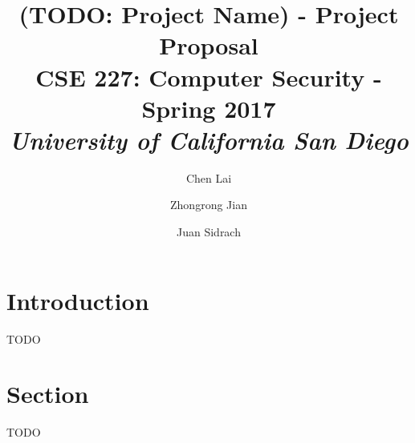 \documentclass[letterpaper,twocolumn,10pt]{article}
\begin{document}
\date{}

\title{\Large \textbf{
(TODO: Project Name) - Project Proposal } \\ \vspace{0.025 in} \large \normalfont
CSE 227: Computer Security - Spring 2017 \\ \textit{
University of California San Diego
}}

\author{
{\rm Chen Lai}\\
\and
{\rm Zhongrong Jian}\\
\and
{\rm Juan Sidrach}\\
}

\maketitle

\section{Introduction}
TODO

\section{Section}
TODO~\cite{ipv4sta}

{\footnotesize 
}
\end{document}
